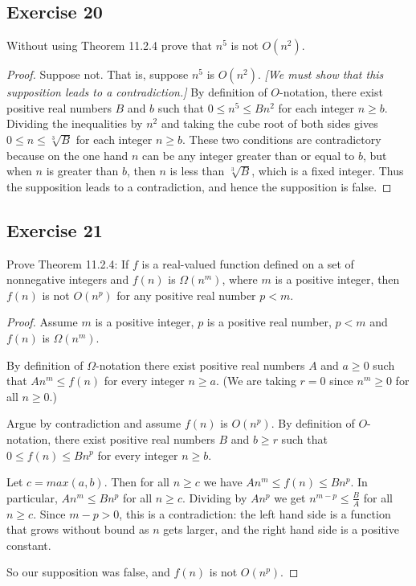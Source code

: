 \documentclass[14pt]{extarticle}
\newcommand{\dps}{\displaystyle}
\begin{document}
\subsection{Exercise 20}
Without using Theorem 11.2.4 prove that \(n^5\) is not \(O(n^2)\).

\begin{proof}
Suppose not. That is, suppose \(n^5\) is \(O(n^2)\). {\it [We must show that this supposition leads to a contradiction.]} By 
definition of \(O\)-notation, there exist positive real numbers \(B\) and \(b\) such that \(0 \leq n^5 \leq Bn^2\) for 
each integer \(n \geq b\). Dividing the inequalities by \(n^2\) and taking the cube root of both sides gives 
\(0 \leq n \leq \sqrt[3]{B}\) for each integer \(n \geq b\). These two conditions are contradictory because on the one hand 
\(n\) can be any integer greater than or equal to \(b\), but when \(n\) is greater than \(b\), then \(n\) is less than 
\(\sqrt[3]{B}\), which is a fixed integer. Thus the supposition leads to a contradiction, and hence the 
supposition is false.
\end{proof}

\subsection{Exercise 21}
Prove Theorem 11.2.4: If \(f\) is a real-valued function defined on a set of nonnegative integers and \(f(n)\) is 
\(\Omega(n^m)\), where \(m\) is a positive integer, then \(f(n)\) is not \(O(n^p)\) for any positive real number 
\(p < m\).

\begin{proof}
Assume \(m\) is a positive integer, \(p\) is a positive real number, \(p < m\) and \(f(n)\) is \(\Omega(n^m)\). 

By definition of \(\Omega\)-notation there exist positive real numbers \(A\) and \(a \geq 0\) such that \(An^m \leq f(n)\) 
for every integer \(n \geq a\). (We are taking \(r = 0\) since \(n^m \geq 0\) for all \(n \geq 0\).)

Argue by contradiction and assume \(f(n)\) is \(O(n^p)\). By definition of \(O\)-notation, there exist positive real 
numbers \(B\) and \(b \geq r\) such that \(0 \leq f(n) \leq Bn^p\) for every integer \(n \geq b\).

Let \(c = max(a, b)\). Then for all \(n \geq c\) we have \(An^m \leq f(n) \leq Bn^p\). In particular, \(An^m \leq Bn^p\)
for all \(n \geq c\). Dividing by \(An^p\) we get \(\dps n^{m-p} \leq \frac{B}{A}\) for all \(n \geq c\). Since \(m-p > 0\),
this is a contradiction: the left hand side is a function that grows without bound as \(n\) gets larger, and the right hand
side is a positive constant.

So our supposition was false, and \(f(n)\) is not \(O(n^p)\).
\end{proof}
\end{document}
